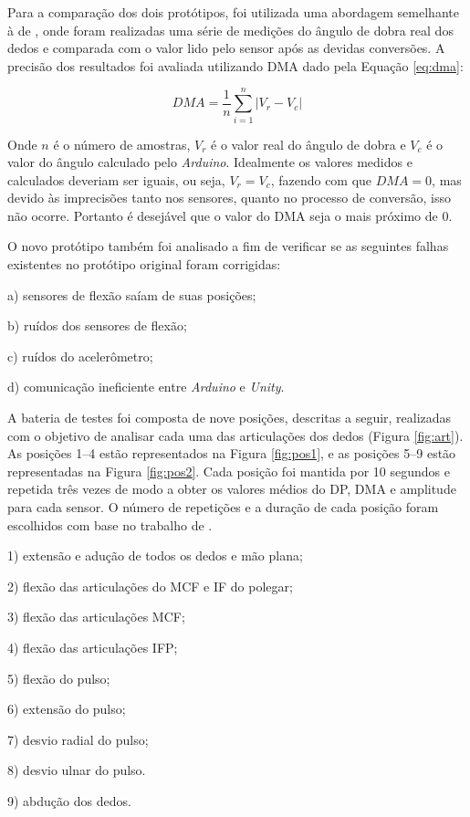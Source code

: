 Para a comparação dos dois protótipos, foi utilizada uma abordagem semelhante à de , onde foram realizadas uma série de medições do ângulo de dobra real dos dedos e comparada com o valor lido pelo sensor após as devidas conversões. A precisão dos resultados foi avaliada utilizando \ac{DMA} dado pela Equação \ref{eq:dma}: 

\begin{equation} \label{eq:dma}
	DMA = \frac{1}{n}\sum_{i=1}^n\lvert V_r - V_c \rvert
\end{equation}

Onde $n$ é o número de amostras, $V_r$ é o valor real do ângulo de dobra e $V_c$ é o valor do ângulo calculado pelo \textit{Arduino}. Idealmente os valores medidos e calculados deveriam ser iguais, ou seja, $V_r=V_c$, fazendo com que $DMA=0$, mas devido às imprecisões tanto nos sensores, quanto no processo de conversão, isso não ocorre. Portanto é desejável que o valor do \ac{DMA} seja o mais próximo de $0$.

O novo protótipo também foi analisado a fim de verificar se as seguintes falhas existentes no protótipo original foram corrigidas:

\begin{compactitem}
  \item[a)] sensores de flexão saíam de suas posições;
  \item[b)] ruídos dos sensores de flexão;
  \item[c)] ruídos do acelerômetro;
  \item[d)] comunicação ineficiente entre \textit{Arduino} e \textit{Unity}.
\end{compactitem}

A bateria de testes foi composta de nove posições, descritas a seguir, realizadas com o objetivo de analisar cada uma das articulações dos dedos (Figura \ref{fig:art}). As posições 1--4 estão representados na Figura \ref{fig:pos1}, e as posições 5--9 estão representadas na Figura \ref{fig:pos2}. Cada posição foi mantida por 10 segundos e repetida três vezes de modo a obter os valores médios do \ac{DP}, \ac{DMA} e amplitude para cada sensor. O número de repetições e a duração de cada posição foram escolhidos com base no trabalho de .

\begin{compactitem}
  \item[1)] extensão e adução de todos os dedos e mão plana;
  \item[2)] flexão das articulações do \ac{MCF} e \ac{IF} do polegar;
  \item[3)] flexão das articulações \ac{MCF};
  \item[4)] flexão das articulações \ac{IFP};
  \item[5)] flexão do pulso;
  \item[6)] extensão do pulso;
  \item[7)] desvio radial do pulso;
  \item[8)] desvio ulnar do pulso.
  \item[9)] abdução dos dedos.
\end{compactitem}

